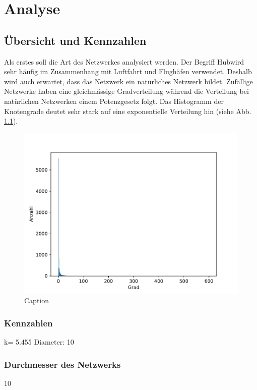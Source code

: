 \chapter{Analyse}
\label{ch:Analysis}



\section{Übersicht und Kennzahlen}
\label{sec:overview-numbers}
Als erstes soll die Art des Netzwerkes analysiert werden. Der Begriff \guillemotleft Hub\guillemotright wird sehr
häufig im Zusammenhang mit Luftfahrt und Flughäfen verwendet.
Deshalb wird auch erwartet, dass das Netzwerk ein natürliches Netzwerk bildet.
Zufällige Netzwerke haben eine gleichmässige Gradverteilung während die Verteilung bei natürlichen Netzwerken einem
Potenzgesetz folgt.
Das Histogramm der Knotengrade deutet sehr stark auf eine exponentielle Verteilung hin (siehe Abb. \ref{fig:degreeHistogram}).

\begin{figure}
    \centering
    \includegraphics[width=0.75\linewidth]{images/degree-histogram.pdf}
    \caption{Caption}
    \label{fig:degreeHistogram}
\end{figure}

\subsection{Kennzahlen}

\langle k\rangle = 5.455
Diameter: 10
\gamma

\subsection{Durchmesser des Netzwerks}
10



